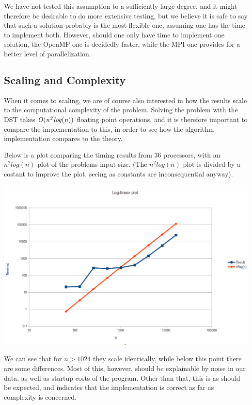 \documentclass[fontsize=11pt,paper=a4,titlepage]{article}
\begin{document}
We have not tested this assumption to a sufficiently large degree, and it might
therefore be desirable to do more extensive testing, but we believe it is safe
to say that such a solution probably is the most flexible one, assuming one has
the time to implement both. However, should one only have time to implement one
solution, the OpenMP one is decidedly faster, while the MPI one provides for a
better level of parallelization.

\subsection{Scaling and Complexity} When it comes to scaling, we are of course
also interested in how the results scale to the computational complexity of the
problem. Solving the problem with the DST takes $\it O (n^2log(n))$ floating point
operations, and it is therefore important to compare the implementation to this,
in order to see how the algorithm implementation compares to the theory.

Below is a plot comparing the timing results from 36 processors, with an
$n^2log(n)$ plot of the problems input size. (The $n^2log(n)$ plot is divided by
a costant to improve the plot, seeing as constants are inconsequential anyway).

\hspace*{-1cm}\includegraphics[scale=0.55]{pics/logplot.png}

We can see that for $n > 1024$ they scale identically, while below this point
there are some differences. Most of this, however, should be explainable by
noise in our data, as well as startup-costs of the program. Other than that,
this is as should be expected, and indicates that the implementation is correct
as far as complexity is concerned.
\end{document}
